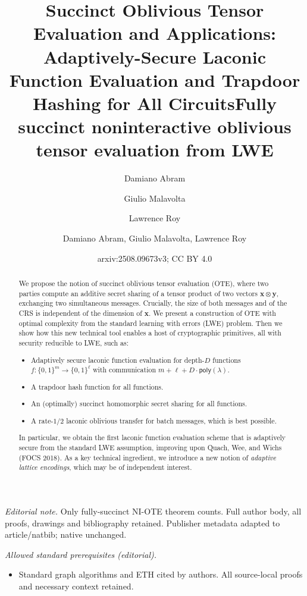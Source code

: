 \documentclass{article}
\author{Damiano Abram \and Giulio Malavolta \and Lawrence Roy}\date{}
\title{Succinct Oblivious Tensor Evaluation and Applications: Adaptively-Secure Laconic Function Evaluation and Trapdoor Hashing for All Circuits}
\title{Fully succinct noninteractive oblivious tensor evaluation from LWE}
\author{Damiano Abram, Giulio Malavolta, Lawrence Roy}
\date{arxiv:2508.09673v3; CC BY 4.0}
\newcommand{\poly}{\mathsf{poly}}
\renewcommand{\sec}{\ensuremath{\lambda}}
\begin{document}
\maketitle
\noindent\textit{Editorial note.} Only fully-succinct NI-OTE theorem counts. Full author body, all proofs, drawings and bibliography retained. Publisher metadata adapted to article/natbib; native unchanged.\par\medskip
\noindent\textit{Allowed standard prerequisites (editorial).}\begin{itemize}
\item Standard graph algorithms and ETH cited by authors. All source-local proofs and necessary context retained.
\end{itemize}\medskip

\maketitle
\begin{abstract}
    We propose the notion of succinct oblivious tensor evaluation (OTE), where two parties compute an additive secret sharing of a tensor product of two vectors $\mathbf{x} \otimes \mathbf{y}$, exchanging two simultaneous messages. Crucially, the size of both messages and of the CRS is independent of the dimension of $\mathbf{x}$.
    We present a construction of OTE with optimal complexity from the standard learning with errors (LWE) problem. Then we show how this new technical tool enables a host of cryptographic primitives, all with security reducible to LWE, such as:
    \begin{itemize}
        \item Adaptively secure laconic function evaluation for depth-$D$ functions $f:\{0, 1\}^m\rightarrow\{0, 1\}^\ell$ with communication $m+\ell+ D\cdot\poly(\sec)$.
        \item A trapdoor hash function for all functions.
        \item An (optimally) succinct homomorphic secret sharing for all functions.
        \item A rate-$1/2$ laconic oblivious transfer for batch messages, which is best possible.
    \end{itemize}
    In particular, we obtain the first laconic function evaluation scheme that is adaptively secure from the standard LWE assumption, improving upon Quach, Wee, and Wichs (FOCS 2018). 
    As a key technical ingredient, we introduce a new notion of \emph{adaptive lattice encodings}, which may be of independent interest.
\end{abstract}
\end{document}
